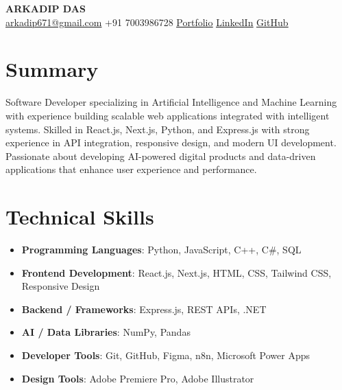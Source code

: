 \documentclass[a4paper,20pt]{article}
\newcommand{\resumeSubItem}[2]{
\item \small{\textbf{#1}: #2}
}
\newcommand{\resumeSubHeadingListStart}{\begin{itemize}[leftmargin=*]}
\newcommand{\resumeSubHeadingListEnd}{\end{itemize}}
\begin{document}

\begin{center}
{\huge \textbf{ARKADIP DAS}}\\[6pt]

\href{mailto:arkadip671@gmail.com}{arkadip671@gmail.com} \;\textbar\;
+91 7003986728 \;\textbar\;
\underline{\href{https://portfolio-arkade.vercel.app/}{Portfolio}} \;\textbar\;
\underline{\href{https://www.linkedin.com/in/arkadip-das-628a02278/}{LinkedIn}} \;\textbar\;
\underline{\href{https://github.com/notArkade}{GitHub}}

\end{center}


\section{Summary}

Software Developer specializing in Artificial Intelligence and Machine Learning with experience building scalable web applications integrated with intelligent systems. Skilled in React.js, Next.js, Python, and Express.js with strong experience in API integration, responsive design, and modern UI development. Passionate about developing AI-powered digital products and data-driven applications that enhance user experience and performance.


\section{Technical Skills}

\resumeSubHeadingListStart

\resumeSubItem{Programming Languages}{Python, JavaScript, C++, C\#, SQL}

\resumeSubItem{Frontend Development}{React.js, Next.js, HTML, CSS, Tailwind CSS, Responsive Design}

\resumeSubItem{Backend / Frameworks}{Express.js, REST APIs, .NET}

\resumeSubItem{AI / Data Libraries}{NumPy, Pandas}

\resumeSubItem{Developer Tools}{Git, GitHub, Figma, n8n, Microsoft Power Apps}

\resumeSubItem{Design Tools}{Adobe Premiere Pro, Adobe Illustrator}

\resumeSubHeadingListEnd
\end{document}
